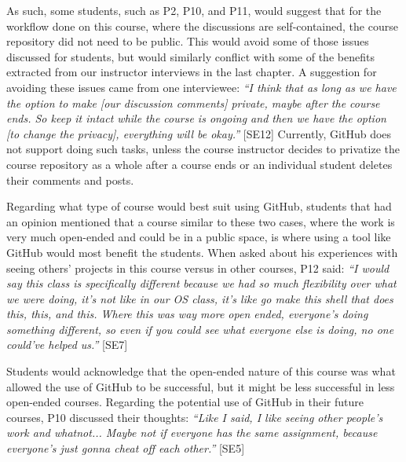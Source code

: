 As such, some students, such as P2, P10, and P11, would suggest that for the workflow done on this course, where the discussions are self-contained, the course repository did not need to be public. This would avoid some of those issues discussed for students, but would similarly conflict with some of the benefits extracted from our instructor interviews in the last chapter. A suggestion for avoiding these issues came from one interviewee: \textit{``I think that as long as we have the option to make [our discussion comments] private, maybe after the course ends. So keep it intact while the course is ongoing and then we have the option [to change the privacy], everything will be okay.''} [SE12] Currently, GitHub does not support doing such tasks, unless the course instructor decides to privatize the course repository as a whole after a course ends or an individual student deletes their comments and posts. %

Regarding what type of course would best suit using GitHub, students that had an opinion mentioned that a course similar to these two cases, where the work is very much open-ended and could be in a public space, is where using a tool like GitHub would most benefit the students. When asked about his experiences with seeing others' projects in this course versus in other courses, P12 said: \textit{``I would say this class is specifically different because we had so much flexibility over what we were doing, it's not like in our OS class, it's like go make this shell that does this, this, and this. Where this was way more open ended, everyone's doing something different, so even if you could see what everyone else is doing, no one could've helped us.''} [SE7]

Students would acknowledge that the open-ended nature of this course was what allowed the use of GitHub to be successful, but it might be less successful in less open-ended courses. Regarding the potential use of GitHub in their future courses, P10 discussed their thoughts: \textit{``Like I said, I like seeing other people's work and whatnot... Maybe not if everyone has the same assignment, because everyone's just gonna cheat off each other.''} [SE5]


